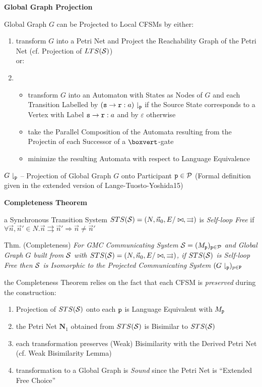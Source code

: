 \textbf{Global Graph Projection}

Global Graph $G$ can be Projected to Local CFSMs by either:
\begin{enumerate}[label=(\alph*)]
  \item transform $G$ into a Petri Net and Project the Reachability
    Graph of the Petri Net (cf. Projection of $LTS(\mathcal{S})$)
  \\ or:
  \item \begin{itemize}
    \item transform $G$ into an Automaton with States as Nodes of $G$
      and each Transition Labelled by
      $(\mathtt{s}\rightarrow\mathtt{r}:a)\downharpoonright_\mathtt{p}$
      if the Source State corresponds to a Vertex with Label
      $\mathtt{s}\rightarrow\mathtt{r}:a$ and by $\varepsilon$ otherwise
    \item take the Parallel Composition of the Automata resulting from
      the Projectin of each Successor of a $\boxvert$-gate
    \item minimize the resulting Automata with respect to Language
      Equivalence
  \end{itemize}
\end{enumerate}

$G\downharpoonright_\mathtt{p}$ -- Projection of Global Graph $G$ onto
Participant $\mathtt{p}\in\mathcal{P}$ (Formal definition given in the
extended version of Lange-Tuosto-Yoshida15)


\textbf{Completeness Theorem}

a Synchronous Transition System $STS(\mathcal{S}) =
(N,\vec{n}_0,E/\bowtie,\rightrightarrows)$ is \emph{Self-loop Free} if
$\forall\vec{n},\vec{n}'\in{N} . \vec{n}\rightrightarrows\vec{n}'
\Longrightarrow \vec{n}\neq\vec{n}'$

Thm. (Completeness) \emph{For GMC Communicating System $\mathcal{S} =
  (M_\mathtt{p})_\mathtt{p\in\mathcal{P}}$ and Global Graph $G$ built from
  $\mathcal{S}$ with $STS(\mathcal{S}) =
  (N,\vec{n}_0,E/\bowtie,\rightrightarrows)$, if $STS(\mathcal{S})$ is
  Self-loop Free then $\mathcal{S}$ is Isomorphic to the Projected
  Communicating System
  $(G\downharpoonright_\mathtt{p})_{p\in\mathtt{P}}$}

the Completeness Theorem relies on the fact that each CFSM is
\emph{preserved} during the construction:
\begin{enumerate}
  \item Projection of $STS(\mathcal{S})$ onto each $\mathtt{p}$ is
    Language Equivalent with $M_\mathtt{p}$
  \item the Petri Net $\mathbf{N}_1$ obtained from $STS(\mathcal{S})$ is
    Bisimilar to $STS(\mathcal{S})$
  \item each transformation preserves (Weak) Bisimilarity with the
    Derived Petri Net (cf. Weak Bisimilarity Lemma)
  \item transformation to a Global Graph is \emph{Sound} since the
    Petri Net is ``Extended Free Choice'' %
\end{enumerate}


